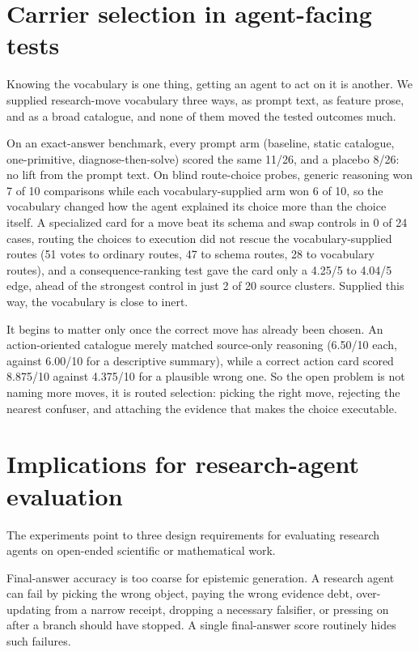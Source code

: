\documentclass[11pt]{article}
\begin{document}
\section{Carrier selection in agent-facing tests}

Knowing the vocabulary is one thing, getting an agent to act on it is another. We
supplied research-move vocabulary three ways, as prompt text, as feature prose, and
as a broad catalogue, and none of them moved the tested outcomes much.

On an exact-answer benchmark, every prompt arm (baseline, static catalogue,
one-primitive, diagnose-then-solve) scored the same 11/26, and a placebo 8/26: no
lift from the prompt text. On blind route-choice probes, generic reasoning won 7 of
10 comparisons while each vocabulary-supplied arm won 6 of 10, so the vocabulary
changed how the agent explained its choice more than the choice itself. A
specialized card for a move beat its schema and swap controls in 0 of 24 cases,
routing the choices to execution did not rescue the vocabulary-supplied routes (51
votes to ordinary routes, 47 to schema routes, 28 to vocabulary routes), and a
consequence-ranking test gave the card only a 4.25/5 to 4.04/5 edge, ahead of the
strongest control in just 2 of 20 source clusters. Supplied this way, the
vocabulary is close to inert.

It begins to matter only once the correct move has already been chosen. An
action-oriented catalogue merely matched source-only reasoning (6.50/10 each,
against 6.00/10 for a descriptive summary), while a correct action card scored
8.875/10 against 4.375/10 for a plausible wrong one. So the open problem is not
naming more moves, it is routed selection: picking the right move, rejecting the
nearest confuser, and attaching the evidence that makes the choice executable.

\section{Implications for research-agent evaluation}

The experiments point to three design requirements for evaluating research agents
on open-ended scientific or mathematical work.

Final-answer accuracy is too coarse for epistemic generation. A research agent can
fail by picking the wrong object, paying the wrong evidence debt, over-updating
from a narrow receipt, dropping a necessary falsifier, or pressing on after a
branch should have stopped. A single final-answer score routinely hides such
failures.
\end{document}
